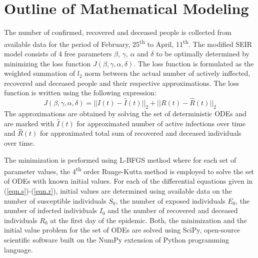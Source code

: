 \documentclass[conference]{IEEEtran}
\begin{document}
\appendices
\renewcommand{\theequation}{\thesection.\arabic{equation}}
\setcounter{equation}{0}

\section{Outline of Mathematical Modeling}
\label{sec.mathdetails}
The number of confirmed, recovered and deceased people is collected from available data for the period of February, 25\textsuperscript{th} to April, 11\textsuperscript{th}. The modified SEIR model consists of 4 free parameters $\beta$, $\gamma$, $\alpha$ and $\delta$ to be optimally determined by minimizing the loss function $J(\beta, \gamma, \alpha, \delta)$. The loss function is formulated as the weighted summation of $l_2$ norm between the actual number of actively inffected, recovered and deceased people and their respective approximations. The loss function is written using the following expression:
\begin{equation}
    J(\beta, \gamma, \alpha, \delta) = \lvert\lvert I(t) - \hat{I}(t)\lvert\lvert_2 + \lvert\lvert R(t) - \hat{R}(t)\lvert\lvert_2
\end{equation}
The approximations are obtained by solving the set of deterministic ODEs and are marked with $\hat{I}(t)$ for approximated number of active infections over time and $\hat{R}(t)$ for approximated total sum of recovered and deceased individuals over time. 

The minimization is performed using L-BFGS method where for each set of parameter values, the 4\textsuperscript{th} order Runge-Kutta method is employed to solve the set of ODEs with known initial values. For each of the differential equations given in (\ref{eqn.s})-(\ref{eqn.r}), initial values are determined using available data on the number of susceptible individuals $S_0$, the number of exposed individuals $E_0$, the number of infected individuals $I_0$ and the number of recovered and deceased individuals $R_0$ at the first day of the epidemic. Both, the minimization and the initial value problem for the set of ODEs are solved using SciPy, open-source scientific software built on the NumPy extension of Python programming language.

\setcounter{equation}{0}
\end{document}
